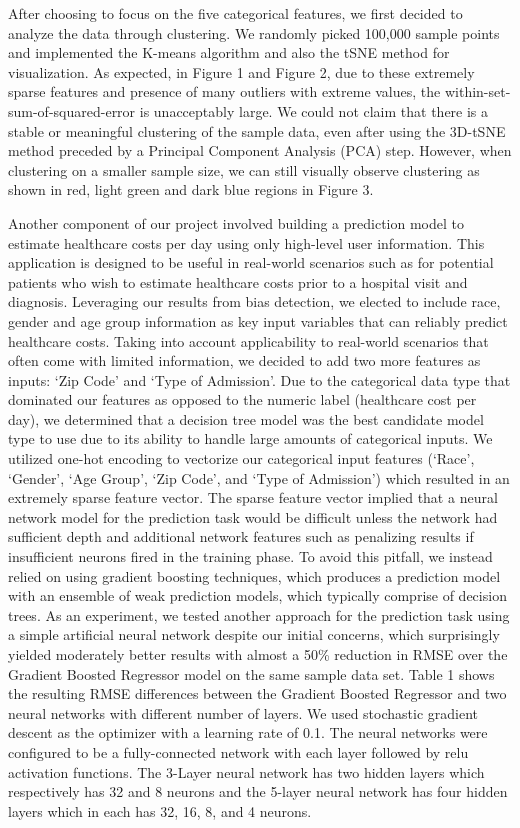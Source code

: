 \documentclass[10pt,twocolumn,letterpaper]{article}
\begin{document}
After choosing to focus on the five categorical features, we first decided to analyze the data through clustering. We randomly picked 100,000 sample points and implemented the K-means algorithm and also the tSNE method for visualization. As expected, in Figure 1 and Figure 2, due to these extremely sparse features and presence of many outliers with extreme values, the within-set-sum-of-squared-error is unacceptably large. We could not claim that there is a stable or meaningful clustering of the sample data, even after using the 3D-tSNE method preceded by a Principal Component Analysis (PCA) step. However, when clustering on a smaller sample size, we can still visually observe clustering as shown in red, light green and dark blue regions in Figure 3.

Another component of our project involved building a prediction model to estimate healthcare costs per day using only high-level user information. This application is designed to be useful in real-world scenarios such as for potential patients who wish to estimate healthcare costs prior to a hospital visit and diagnosis. Leveraging our results from bias detection, we elected to include race, gender and age group information as key input variables that can reliably predict healthcare costs. Taking into account applicability to real-world scenarios that often come with limited information, we decided to add two more features as inputs: `Zip Code' and `Type of Admission'. Due to the categorical data type that dominated our features as opposed to the numeric label (healthcare cost per day), we determined that a decision tree model was the best candidate model type to use due to its ability to handle large amounts of categorical inputs. We utilized one-hot encoding to vectorize our categorical input features (`Race', `Gender', `Age Group', `Zip Code', and `Type of Admission') which resulted in an extremely sparse feature vector. The sparse feature vector implied that a neural network model for the prediction task would be difficult unless the network had sufficient depth and additional network features such as penalizing results if insufficient neurons fired in the training phase. To avoid this pitfall, we instead relied on using gradient boosting techniques, which produces a prediction model with an ensemble of weak prediction models, which typically comprise of decision trees. 
As an experiment, we tested another approach for the prediction task using a simple artificial neural network despite our initial concerns, which surprisingly yielded moderately better results with almost a 50\% reduction in RMSE over the Gradient Boosted Regressor model on the same sample data set. Table 1 shows the resulting RMSE differences between the Gradient Boosted Regressor and two neural networks with different number of layers. We used stochastic gradient descent as the optimizer with a learning rate of 0.1. The neural networks were configured to be a fully-connected network with each layer followed by relu activation functions. The 3-Layer neural network has two hidden layers which respectively has 32 and 8 neurons and the 5-layer neural network has four hidden layers which in each has 32, 16, 8, and 4 neurons.
\end{document}
